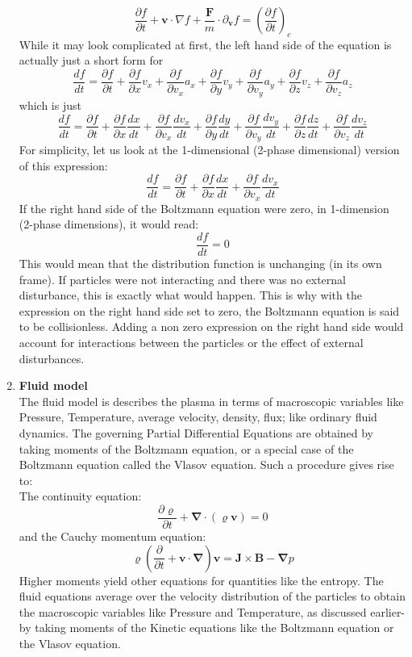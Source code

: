 \documentclass[12pt]{article}
\begin{document}
\begin{enumerate}
		$$\frac{\partial f}{\partial t} + \boldsymbol{v} \cdot \nabla f + \frac{\mathbf{F}}{m} \cdot {\partial}_{\boldsymbol{v}} f = \left(\frac{\partial f}{\partial t}\right)_{c}$$
		While it may look complicated at first, the left hand side of the equation is actually just a short form for
		$$ \frac{df}{dt} = \frac{\partial f}{\partial t} + \frac{\partial f}{\partial x} v_{x} + \frac{\partial f}{\partial v_{x}} a_{x} + \frac{\partial f}{\partial y} v_{y} + \frac{\partial f}{\partial v_{y}} a_{y} + \frac{\partial f}{\partial z} v_{z} + \frac{\partial f}{\partial v_{z}} a_{z}$$
		which is just
		$$ \frac{df}{dt} = \frac{\partial f}{\partial t} + \frac{\partial f}{\partial x} \frac{d x}{d t} + \frac{\partial f}{\partial v_{x}} \frac{d v_{x}}{d t} + \frac{\partial f}{\partial y} \frac{d y}{d t} + \frac{\partial f}{\partial v_{y}} \frac{d v_{y}}{d t} + \frac{\partial f}{\partial z} \frac{d z}{d t} + \frac{\partial f}{\partial v_{z}} \frac{d v_{z}}{d t}$$
		For simplicity, let us look at the 1-dimensional (2-phase dimensional) version of this expression:
		$$ \frac{df}{dt} = \frac{\partial f}{\partial t} + \frac{\partial f}{\partial x} \frac{d x}{d t} + \frac{\partial f}{\partial v_{x}} \frac{d v_{x}}{d t}$$
		If the right hand side of the Boltzmann equation were zero, in 1-dimension (2-phase dimensions), it would read:
		$$\frac{df}{dt} = 0$$
		This would mean that the distribution function is unchanging (in its own frame). If particles were not interacting and there was no external disturbance, this is exactly what would happen. This is why with the expression on the right hand side set to zero, the Boltzmann equation is said to be collisionless. Adding a non zero expression on the right hand side would account for interactions between the particles or the effect of external disturbances. 
		
		\item \textbf{Fluid model} \\
		The fluid model is describes the plasma in terms of macroscopic variables like Pressure, Temperature, average velocity, density, flux; like ordinary fluid dynamics. The governing Partial Differential Equations are obtained by taking moments of the Boltzmann equation, or a special case of the Boltzmann equation called the Vlasov equation. Such a procedure gives rise to: \\
		
		The continuity equation: \\
		$$\frac{\partial \varrho}{\partial t} + \boldsymbol{\nabla} \cdot \left(\varrho \boldsymbol{v}\right) = 0$$
		and the Cauchy momentum equation: \\
		$$\varrho \left(\frac{\partial}{\partial t} + \boldsymbol{v} \cdot \boldsymbol{\nabla}  \right) \boldsymbol{v} = \mathbf{J} \times \mathbf{B} - \boldsymbol{\nabla} p$$
		Higher moments yield other equations for quantities like the entropy. The fluid equations average over the velocity distribution of the particles to obtain the macroscopic variables like Pressure and Temperature, as discussed earlier- by taking moments of the Kinetic equations like the Boltzmann equation or the Vlasov equation.
		

\end{enumerate}
\end{document}
